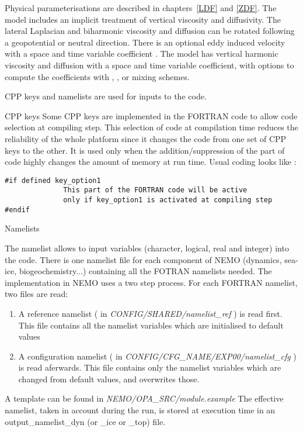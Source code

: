 \documentclass[NEMO_book]{subfiles}
\begin{document}
Physical parameterisations are described in chapters~\ref{LDF} and \ref{ZDF}. The 
model includes an implicit treatment of vertical viscosity and diffusivity. The lateral 
Laplacian and biharmonic viscosity and diffusion can be rotated following a geopotential 
or neutral direction. There is an optional eddy induced velocity \citep{Gent1990} with a 
space and time variable coefficient \citet{Treguier1997}. The model has vertical harmonic 
viscosity and diffusion with a space and time variable coefficient, with options to compute 
the coefficients with \citet{Blanke1993}, \citet{Pacanowski_Philander_JPO81}, 
or \citet{Umlauf_Burchard_JMS03} mixing schemes.
 \vspace{1cm}
 

\noindent CPP keys and namelists are used for inputs to the code.  \newline

\noindent {} CPP keys \newline
Some CPP keys are implemented in the FORTRAN code to allow code selection at compiling step. This selection of code at compilation time reduces the reliability of the whole platform since it changes the code from one set of CPP keys to the other. It is used only when the addition/suppression of the part of code highly changes the amount of memory at run time.
Usual coding looks like : 
 \vspace{-10pt}
\begin{alltt}
\tiny  
\begin{verbatim}
#if defined key_option1    
	          This part of the FORTRAN code will be active   
	          only if key_option1 is activated at compiling step 
#endif  
\end{verbatim} 
\end{alltt}     


\noindent {} Namelists

The namelist allows to input variables (character, logical, real and integer) into the code. There is one namelist file for each component of NEMO (dynamics, sea-ice, biogeochemistry...) containing all the FOTRAN namelists needed. The implementation in NEMO uses a two step process. For each FORTRAN namelist, two files are read:
\begin{enumerate}
\item A reference namelist ( in \textit{CONFIG/SHARED/namelist\_ref} ) is read first. This file contains all the namelist variables which are initialised to default values  
\item A configuration namelist ( in \textit{CONFIG/CFG\_NAME/EXP00/namelist\_cfg} ) is read aferwards. This file contains only the namelist variables which are changed from default values, and overwrites those.
\end{enumerate}
A template can be found in \textit{NEMO/OPA\_SRC/module.example}
The effective namelist, taken in account during the run, is stored at execution time in an output\_namelist\_dyn (or \_ice or \_top) file.
 \vspace{1cm}
\end{document}

